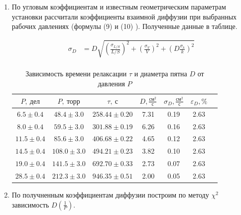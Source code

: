 \documentclass[a4paper,12pt]{article}
\begin{document}
\begin{enumerate}
        \item По угловым коэффициентам и известным геометрическим параметрам установки рассчитали коэффициенты взаимной диффузии при выбранных рабочих давлениях (формулы (9) и (10) ). Полученные данные в таблице.

        \begin{align*}
            \sigma_D &= D \sqrt{\left( \frac{\sigma_{L/S}}{L/S} \right)^2 + \left( \frac{\sigma_V}{V} \right)^2 + \left( D \frac{\sigma_k}{k} \right)^2}\\
        \end{align*}

        \begin{table}[h!]
    \centering
    \begin{tabular}{|c|c|c|c|c|c|c|}
        \hline
        $P,  \ \text{дел}$ & $P, \  \text{торр}$ & $\tau,  \ \text{с}$ & $D, \frac{\text{см}^2}{\text{с}}$ & $\sigma_D, \frac{\text{см}^2}{\text{с}}$ & $\varepsilon_D, \%$ \\
        \hline
        $6.5 \pm 0.4$   & $48.4 \pm 3.0$  & $258.44 \pm 0.20$ & 7.31 & 0.19 & 2.63 \\ \hline
        $8.0 \pm 0.4$   & $59.5 \pm 3.0$  & $301.88 \pm 0.19$ & 6.26 & 0.16 & 2.63 \\ \hline
        $11.5 \pm 0.4$  & $85.6 \pm 3.0$  & $406.68 \pm 0.22$ & 4.65 & 0.12 & 2.63 \\ \hline
        $14.5 \pm 0.4$  & $108.0 \pm 3.0$ & $494.21 \pm 0.23$ & 3.82 & 0.10 & 2.63 \\ \hline
        $19.0 \pm 0.4$  & $141.5 \pm 3.0$ & $692.70 \pm 0.33$ & 2.73 & 0.07 & 2.63 \\ \hline
        $28.5 \pm 0.4$  & $212.3 \pm 3.0$ & $946.35 \pm 0.51$ & 2.00 & 0.05 & 2.63 \\
        \hline
    \end{tabular}
    \caption{Зависимость времени релаксации $\tau$ и диаметра пятна $D$ от давления $P$}
\end{table}

    \item По получненным коэффициентам диффузии построим по методу $\chi^2$ зависимость $D(\frac{1}{P})$. 


\end{enumerate}
\end{document}
